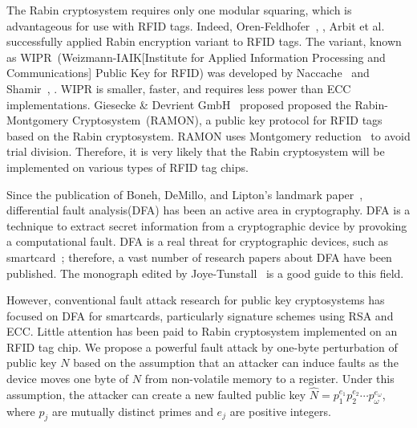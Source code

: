\documentclass{article}
\begin{document}
The Rabin cryptosystem requires only one modular squaring, which 
is advantageous for use with RFID tags. 
Indeed, Oren-Feldhofer~\cite{Oren-Feldhofer}, \cite{Oren-Feldhofer2}, Arbit et al.~\cite{Implement} 
successfully applied Rabin encryption variant to RFID tags. The variant, known as 
WIPR~(Weizmann-IAIK[Institute for Applied Information Processing and Communications] Public Key for RFID) 
was developed by Naccache~\cite{Naccache} and Shamir~\cite{Shamir}, \cite{Shamir2}. 
WIPR is smaller, faster, and requires less power than ECC implementations. 
Giesecke \& Devrient GmbH~\cite{RAMON} proposed 
proposed the Rabin-Montgomery Cryptosystem~(RAMON), 
a public key protocol for RFID tags based on the Rabin cryptosystem. 
RAMON uses Montgomery reduction~\cite{Mont} to avoid trial division. 
Therefore, it is very likely that the Rabin cryptosystem 
will be implemented on  various types of RFID tag chips. 

Since the publication of Boneh, DeMillo, and Lipton's landmark paper~\cite{Bellcore}, 
differential fault analysis(DFA) has been an active area in cryptography. 
DFA is a technique to extract secret information from a cryptographic device by provoking a computational fault. 
DFA is a real threat for cryptographic devices, such as smartcard~\cite{Bar}; therefore, 
a vast number of research papers about DFA have been published. 
The monograph edited by Joye-Tunstall~\cite{Joye-Tunstall-Book} is a good guide to this field. 

However, conventional fault attack research for public key cryptosystems 
has focused on DFA for smartcards, particularly signature schemes using RSA and ECC. 
Little attention has been paid to Rabin cryptosystem implemented on an RFID tag chip. 
We propose a powerful fault attack by one-byte perturbation of public key $N$
 based on the assumption that an attacker can induce faults as 
 the device moves one byte of $N$ from non-volatile memory to a register.
Under this assumption, the attacker can create a new faulted public key $\hat{N}=p_1^{e_1}p_2^{e_2}\cdots p_{\omega}^{e_{\omega}}$, 
where $p_j$ are mutually distinct primes and $e_j$ are positive integers. 
\end{document}
